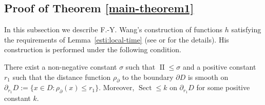 \documentclass[11pt,reqno]{amsart}
\theoremstyle{definition} \newtheorem{remark}[theorem]{Remark}
\numberwithin{equation}{section}
\def\Sect{{\operatorname{Sect}}}
\newcommand\1{\mathbbm{1}}
\def\II{{\operatorname{II}}}
\begin{document}
\subsection{Proof of Theorem \ref{main-theorem1}}\label{Section-Construction-of-h}
In this subsection we describe F.-Y. Wang's  construction of functions $h$ satisfying the requirements of Lemma~\ref{esti:local-time} (see
\cite[p.~1436]{W07} or \cite[Theorem 3.2.9]{Wbook2} for the details). His construction is performed under the following condition.
\medskip


There exist a non-negative constant $\sigma$ such that $\II \leq \sigma$ and a positive constant $r_1$ such that the distance function $\rho_{\partial }$
to the boundary $\partial D$ is smooth on $\partial_{r_1}D:=\{x\in D: \rho_{\partial}(x)\leq r_1\}$. Moreover, $\Sect\leq k$ on $\partial_{r_1}D$ for some positive constant $k$.
\medskip
\end{document}
